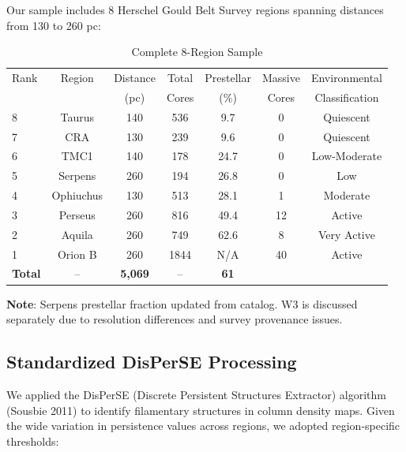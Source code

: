 \documentclass[11pt,a4paper]{article}
\begin{document}
Our sample includes 8 Herschel Gould Belt Survey regions spanning distances from 130 to 260 pc:

\begin{table}[H]
\centering
\caption{Complete 8-Region Sample}
\begin{tabular}{lcccccc}
\toprule
Rank & Region & Distance & Total & Prestellar & Massive & Environmental \\
     &        & (pc)   & Cores & (\%)    & Cores & Classification \\
\midrule
8 & Taurus   & 140     & 536   & 9.7   & 0      & Quiescent \\
7 & CRA      & 130     & 239   & 9.6   & 0      & Quiescent \\
6 & TMC1     & 140     & 178   & 24.7  & 0      & Low-Moderate \\
5 & Serpens  & 260     & 194   & 26.8  & 0      & Low \\
4 & Ophiuchus& 130     & 513   & 28.1  & 1      & Moderate \\
3 & Perseus  & 260     & 816   & 49.4  & 12     & Active \\
2 & Aquila   & 260     & 749   & 62.6  & 8      & Very Active \\
1 & Orion B  & 260     & 1844  & N/A   & 40     & Active \\
\midrule
\textbf{Total} & --      & \textbf{5,069} & --    & \textbf{61} & \\
\bottomrule
\end{tabular}
\end{table}

\noindent\textbf{Note}: Serpens prestellar fraction updated from catalog. W3 is discussed separately due to resolution differences and survey provenance issues.

\subsection{Standardized DisPerSE Processing}

We applied the DisPerSE (Discrete Persistent Structures Extractor) algorithm (Sousbie 2011) to identify filamentary structures in column density maps. Given the wide variation in persistence values across regions, we adopted region-specific thresholds:
\end{document}
